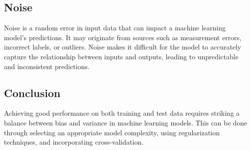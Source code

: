 \documentclass[12pt]{article}
\begin{document}
\subsection{Noise}
Noise is a random error in input data that can impact a machine learning model's predictions. It may originate from sources such as measurement errors, incorrect labels, or outliers. Noise makes it difficult for the model to accurately capture the relationship between inputs and outputs, leading to unpredictable and inconsistent predictions.
\subsection{Conclusion}
Achieving good performance on both training and test data requires striking a balance between bias and variance in machine learning models. This can be done through selecting an appropriate model complexity, using regularization techniques, and incorporating cross-validation.
\end{document}
